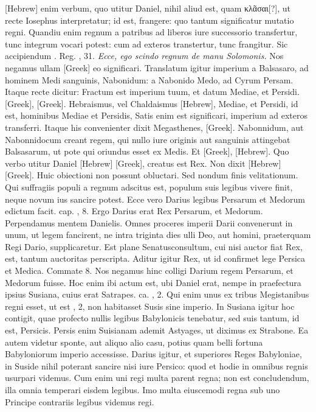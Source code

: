 \texthebrew{[Hebrew]} enim verbum, quo utitur Daniel,
 nihil aliud est, quam
\textgreek{κλᾶσαι[?]}, ut recte Iosephus interpretatur;
 id est, frangere: quo tantum
significatur mutatio regni.
Quandiu enim regnum a patribus
ad liberos iure successorio transfertur, tunc integrum vocari potest:
cum ad exteros transtertur, tunc frangitur.
Sic accipiendum .
Reg. , 31.
\textit{Ecce, ego scindo regnum  de manu Solomonis.}
Nos negamus ullam \textgreek{[Greek]} eo significari.
Translatum igitur imperium
a Balsasaro, ad hominem Medi sanguinis, Nabonidum: a Nabonido
Medo, ad Cyrum Persam.
Itaque recte dicitur: Fractum est
imperium tuum, et datum Mediae, et Persidi.
\textgreek{[Greek]},
\textgreek{[Greek]}.
Hebraismus, vel Chaldaismus
\texthebrew{[Hebrew]}, Mediae, et Persidi, id est, hominibus Mediae et Persidis,
Satis enim est significari, imperium ad exteros transferri.
Itaque his convenienter
dixit Megasthenes, \textgreek{[Greek]}.
Nabonnidum, aut Nabonnidocum creant regem, qui
nullo iure originis aut sanguinis attingebat Balsasarum, ut pote qui
oriundus esset ex Medis.
Et \textgreek{[Greek]}, \texthebrew{[Hebrew]}.
Quo verbo utitur
Daniel \texthebrew{[Hebrew]} \textgreek{[Greek]}, creatus est Rex.
Non dixit \texthebrew{[Hebrew]} \textgreek{[Greek]}.
Huic obiectioni non possunt obluctari.
Sed nondum
finis velitationum.
Qui suffragiis populi a regnum adscitus est,
populum suis legibus vivere finit, neque novum ius sancire potest.
Ecce vero Darius legibus Persarum et Medorum edictum facit.
cap. , 8.
Ergo Darius erat Rex Persarum, et Medorum.
Perpendamus
mentem Danielis.
Omnes proceres imperii Darii convenerunt
in unum, ut legem fancirent, ne intra triginta dies ulli
Deo, aut homini, praeterquam Regi Dario, supplicaretur.
Est plane
Senatusconsultum, cui nisi auctor fiat Rex, est, tantum auctoritas
perscripta.
Aditur igitur Rex, ut id confirmet lege Persica et
Medica.
Commate 8.
Nos negamus hinc colligi Darium regem
Persarum, et Medorum fuisse.
Hoc enim ibi actum est, ubi Daniel
erat, nempe in praefectura ipsius Susiana, cuius erat Satrapes.
ca. , 2.
Qui enim unus ex tribus Megistanibus regni esset, ut est
, 2, non habitasset Susis sine imperio.
In Susiana igitur hoc contigit,
quae profecto nullis legibus Babylonicis tenebatur, sed suis
tantum, id est, Persicis.
Persis enim Suisianam ademit Astyages, ut
diximus ex Strabone.
Ea autem videtur sponte, aut aliquo alio casu,
potius quam belli fortuna Babyloniorum imperio accessisse.
Darius igitur, et superiores Reges Babyloniae, in Suside nihil poterant
sancire nisi iure Persico: quod et hodie in omnibus regnis usurpari
videmus.
Cum enim uni regi multa parent regna; non est concludendum,
illa omnia temperari eisdem legibus.
Imo multa eiuscemodi regna sub uno Principe contrariis
 legibus videmus regi.

